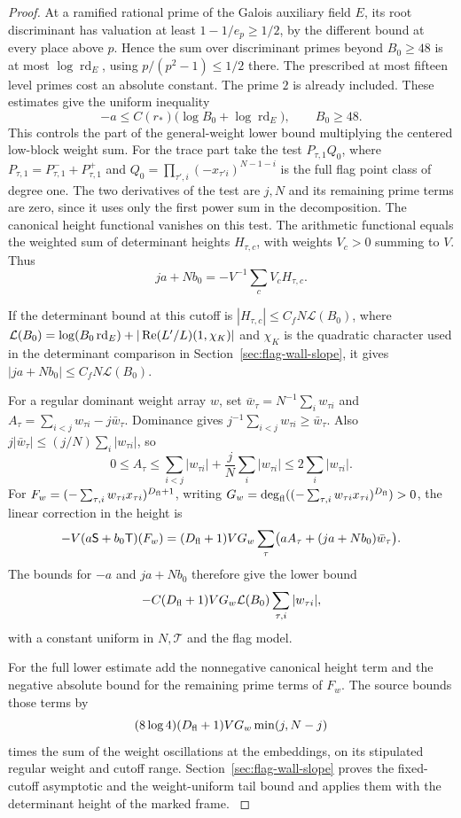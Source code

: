 \begin{proof}
At a ramified rational prime of the
Galois auxiliary field \(E\), its root discriminant has
valuation at least \(1-1/e_p\ge1/2\), by the different
bound at every place above \(p\). Hence the sum over
discriminant primes beyond \(B_0\ge48\) is at most
\(\log\operatorname{rd}_E\), using \(p/(p^2-1)\le1/2\)
there. The prescribed at most fifteen level primes
cost an absolute constant. The prime \(2\) is already
included. These estimates give the uniform inequality
\[
 -a\le C(r_*)\bigl(\log B_0+\log\operatorname{rd}_E\bigr),
 \qquad B_0\ge48 .
\]
This controls the part of the general-weight lower
bound multiplying the centered low-block weight sum.
For the trace part take the test \(P_{\tau,1}Q_0\),
where \(P_{\tau,1}=P^-_{\tau,1}+P^+_{\tau,1}\) and
\(Q_0=\prod_{\tau',i}(-x_{\tau'i})^{N-1-i}\) is
the full flag point class of degree one.
The two derivatives of the test are \(j,N\) and its
remaining prime terms are zero, since it uses
only the first power sum in the decomposition.
The canonical height functional vanishes on this
test. The arithmetic functional equals the weighted
sum of determinant heights \(H_{\tau,c}\), with
weights \(V_c>0\) summing to \(V\). Thus
\[
 ja+Nb_0=-V^{-1}\sum_c V_c H_{\tau,c}.
\]

If the determinant bound at this cutoff is
\(|H_{\tau,c}|\le C_f N \mathcal L(B_0)\), where \(\mathcal L(B_0)=\log(B_0\operatorname{rd}_E)+|\operatorname{Re}(L'/L)(1,\chi_K)|\) and \(\chi_K\) is the quadratic character used in the determinant comparison in Section~\ref{sec:flag-wall-slope},
it gives \(|ja+Nb_0|\le C_f N\mathcal L(B_0)\).

For a regular dominant weight array \(w\), set
\(\bar w_\tau=N^{-1}\sum_i w_{\tau i}\) and
\(A_\tau=\sum_{i<j}w_{\tau i}-j\bar w_\tau\).
Dominance gives \(j^{-1}\sum_{i<j}w_{\tau i}\ge\bar w_\tau\).
Also \(j|\bar w_\tau|\le(j/N)\sum_i|w_{\tau i}|\), so
\[
 0\le A_\tau\le\sum_{i<j}|w_{\tau i}|
      +\frac jN\sum_i|w_{\tau i}|\le2\sum_i|w_{\tau i}|.
\] For
\(F_w=(-\sum_{\tau,i}w_{\tau i}x_{\tau i})^{D_{\rm fl}+1}\),
writing \(G_w=\deg_{\rm fl}((-\sum_{\tau,i}
w_{\tau i}x_{\tau i})^{D_{\rm fl}})>0\), the
linear correction in the height is
\[
 -V(a\mathsf S+b_0\mathsf T)(F_w)
    =(D_{\rm fl}+1)VG_w
           \sum_\tau\bigl(a A_\tau+(ja+Nb_0)\bar w_\tau\bigr).
\]
The bounds for \(-a\) and \(ja+Nb_0\) therefore give the
lower bound
\[
 -C(D_{\rm fl}+1)VG_w\mathcal L(B_0)
     \sum_{\tau,i}|w_{\tau i}|,
\]
with a constant uniform in \(N,\mathcal T\) and the
flag model.

For the full lower estimate add the
nonnegative canonical height term and the negative
absolute bound for the remaining prime terms of
\(F_w\). The source bounds those terms by
\[
 (8\log4)(D_{\rm fl}+1)VG_w\min(j,N-j)
\]
times the
sum of the weight oscillations at the embeddings,
on its stipulated regular weight and cutoff range.
Section~\ref{sec:flag-wall-slope} proves the fixed-cutoff
asymptotic and the weight-uniform tail bound and applies
them with the determinant height of the marked frame.
\label{cor:covolume-flag-test-16}


\end{proof}
